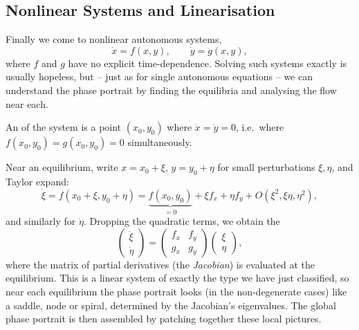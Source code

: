 \documentclass[a4paper]{scrartcl}
\begin{document}
\subsection{Nonlinear Systems and Linearisation}

Finally we come to nonlinear autonomous systems,
$$
\dot x = f(x, y), \qquad \dot y = g(x, y),
$$
where $f$ and $g$ have no explicit time-dependence. Solving such systems exactly is usually hopeless, but -- just as for single autonomous equations -- we can understand the phase portrait by finding the equilibria and analysing the flow near each.

\begin{definition}
	An  of the system is a point $(x_0, y_0)$ where $\dot x = \dot y = 0$, i.e.\ where $f(x_0, y_0) = g(x_0, y_0) = 0$ simultaneously.
\end{definition}

Near an equilibrium, write $x = x_0 + \xi$, $y = y_0 + \eta$ for small perturbations $\xi, \eta$, and Taylor expand:
$$
\dot \xi = f(x_0 + \xi, y_0 + \eta) = \underbrace{f(x_0, y_0)}_{=0} + \xi f_x + \eta f_y + O(\xi^2, \xi\eta, \eta^2),
$$
and similarly for $\dot\eta$. Dropping the quadratic terms, we obtain the 
$$
\begin{pmatrix} \dot \xi \\ \dot \eta \end{pmatrix} = \begin{pmatrix} f_x & f_y \\ g_x & g_y \end{pmatrix}\begin{pmatrix} \xi \\ \eta \end{pmatrix},
$$
where the matrix of partial derivatives (the \emph{Jacobian}) is evaluated at the equilibrium. This is a linear system of exactly the type we have just classified, so near each equilibrium the phase portrait looks (in the non-degenerate cases) like a saddle, node or spiral, determined by the Jacobian's eigenvalues. The global phase portrait is then assembled by patching together these local pictures.
\end{document}

